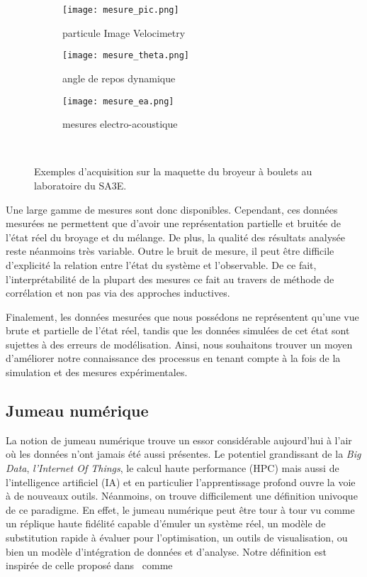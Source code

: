 \begin{figure}[h]
    \centering
    \begin{subfigure}[b]{0.3\textwidth}
        \texttt{[image: mesure\_pic.png]}
        \caption{particule Image Velocimetry}
    \end{subfigure}
    \hfill
    \begin{subfigure}[b]{0.3\textwidth}
        \texttt{[image: mesure\_theta.png]}
        \caption{angle de repos dynamique}
    \end{subfigure}
    \hfill
    \begin{subfigure}[b]{0.3\textwidth}
        \texttt{[image: mesure\_ea.png]}
        \caption{mesures electro-acoustique}
    \end{subfigure}
    \caption{Exemples d'acquisition sur la maquette du broyeur à boulets au laboratoire du SA3E.}~\label{fig:mesures}
\end{figure}

Une large gamme de mesures sont donc disponibles. Cependant, ces données mesurées ne permettent que d'avoir une représentation partielle et bruitée de l'état réel du broyage et du mélange. De plus, la qualité des résultats analysée reste néanmoins très variable. Outre le bruit de mesure, il peut être difficile d'explicité la relation entre l'état du système et l'observable. De ce fait, l'interprétabilité de la plupart des mesures ce fait au travers de méthode de corrélation et non pas via des approches inductives.

Finalement, les données mesurées que nous possédons ne représentent qu'une vue brute et partielle de l'état réel, tandis que les données simulées de cet état sont sujettes à des erreurs de modélisation. Ainsi, nous souhaitons trouver un moyen d'améliorer notre connaissance des processus en tenant compte à la fois de la simulation et des mesures expérimentales.

\subsection*{Jumeau numérique}

La notion de jumeau numérique trouve un essor considérable aujourd'hui à l'air où les données n'ont jamais été aussi présentes. Le potentiel grandissant de la \textit{Big Data}, \textit{l'Internet Of Things}, le calcul haute performance (HPC) mais aussi de l'intelligence artificiel (IA) et en particulier l'apprentissage profond ouvre la voie à de nouveaux outils. Néanmoins, on trouve difficilement une définition univoque de ce paradigme. En effet, le jumeau numérique peut être tour à tour vu comme un réplique haute fidélité capable d'émuler un système réel, un modèle de substitution rapide à évaluer pour l'optimisation, un outils de visualisation, ou bien un modèle d'intégration de données et d'analyse.
Notre définition est inspirée de celle proposé dans~\cite{AIAA2020} comme

